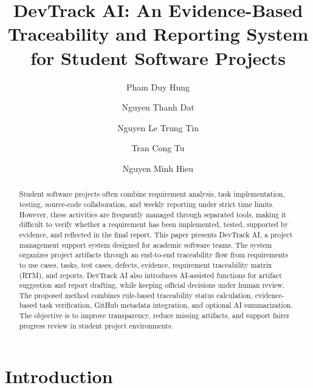 \documentclass[runningheads]{llncs}
\begin{document}
\title{DevTrack AI: An Evidence-Based Traceability and Reporting System for Student Software Projects}


\author{Pham Duy Hung \and
Nguyen Thanh Dat \and
Nguyen Le Trung Tin \and
Tran Cong Tu \and
Nguyen Minh Hieu}



\maketitle

\begin{abstract}
Student software projects often combine requirement analysis, task implementation,
testing, source-code collaboration, and weekly reporting under strict time limits.
However, these activities are frequently managed through separated tools, making it
difficult to verify whether a requirement has been implemented, tested, supported by
evidence, and reflected in the final report. This paper presents DevTrack AI, a
project management support system designed for academic software teams. The system
organizes project artifacts through an end-to-end traceability flow from requirements
to use cases, tasks, test cases, defects, evidence, requirement traceability matrix
(RTM), and reports. DevTrack AI also introduces AI-assisted functions for artifact
suggestion and report drafting, while keeping official decisions under human review.
The proposed method combines rule-based traceability status calculation,
evidence-based task verification, GitHub metadata integration, and optional AI
summarization. The objective is to improve transparency, reduce missing artifacts,
and support fairer progress review in student project environments.

\end{abstract}


\section{Introduction}
\end{document}
